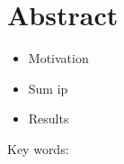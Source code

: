 

\cleardoublepage
\chapter*{Abstract}
\begin{itemize}
  \item Motivation
  \item Sum ip
  \item Results
\end{itemize}

\vskip0.5cm
Key words: 



